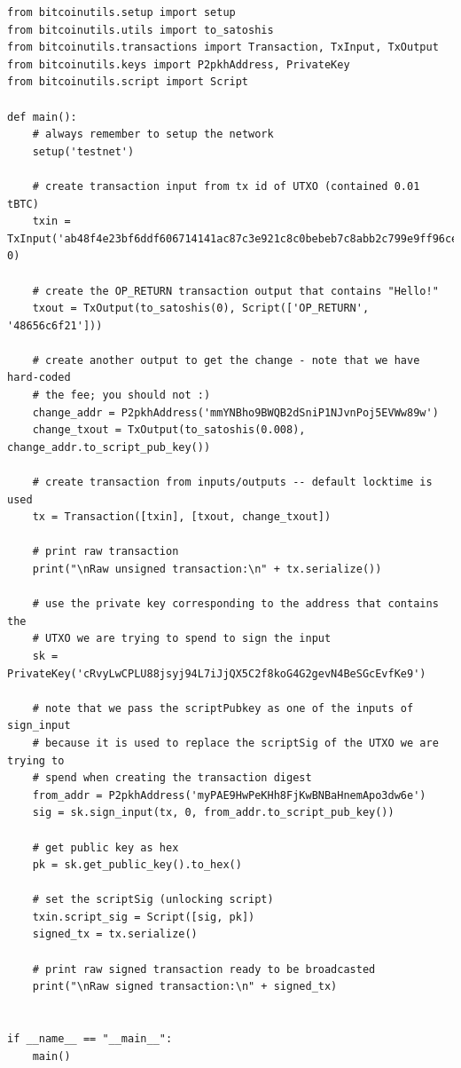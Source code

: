 \vspace{1em}
\begin{lstlisting}[style=Python]
from bitcoinutils.setup import setup
from bitcoinutils.utils import to_satoshis
from bitcoinutils.transactions import Transaction, TxInput, TxOutput
from bitcoinutils.keys import P2pkhAddress, PrivateKey
from bitcoinutils.script import Script

def main():
    # always remember to setup the network
    setup('testnet')

    # create transaction input from tx id of UTXO (contained 0.01 tBTC)
    txin = TxInput('ab48f4e23bf6ddf606714141ac87c3e921c8c0bebeb7c8abb2c799e9ff96ce6f', 0)

    # create the OP_RETURN transaction output that contains "Hello!"
    txout = TxOutput(to_satoshis(0), Script(['OP_RETURN', '48656c6f21']))

    # create another output to get the change - note that we have hard-coded
    # the fee; you should not :)
    change_addr = P2pkhAddress('mmYNBho9BWQB2dSniP1NJvnPoj5EVWw89w')
    change_txout = TxOutput(to_satoshis(0.008), change_addr.to_script_pub_key())

    # create transaction from inputs/outputs -- default locktime is used
    tx = Transaction([txin], [txout, change_txout])

    # print raw transaction
    print("\nRaw unsigned transaction:\n" + tx.serialize())

    # use the private key corresponding to the address that contains the
    # UTXO we are trying to spend to sign the input
    sk = PrivateKey('cRvyLwCPLU88jsyj94L7iJjQX5C2f8koG4G2gevN4BeSGcEvfKe9')

    # note that we pass the scriptPubkey as one of the inputs of sign_input
    # because it is used to replace the scriptSig of the UTXO we are trying to
    # spend when creating the transaction digest
    from_addr = P2pkhAddress('myPAE9HwPeKHh8FjKwBNBaHnemApo3dw6e')
    sig = sk.sign_input(tx, 0, from_addr.to_script_pub_key())

    # get public key as hex
    pk = sk.get_public_key().to_hex()

    # set the scriptSig (unlocking script)
    txin.script_sig = Script([sig, pk])
    signed_tx = tx.serialize()

    # print raw signed transaction ready to be broadcasted
    print("\nRaw signed transaction:\n" + signed_tx)


if __name__ == "__main__":
    main()
\end{lstlisting}
\vspace{1em}



